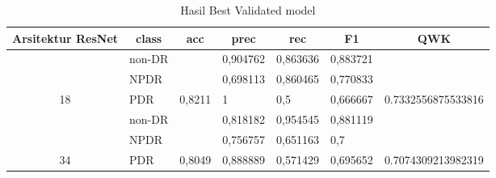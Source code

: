 \begin{table}[hbtp]
	\begin{center}
		\caption{Hasil Best Validated model}
		\label{tb:HasilValDefault}
		\begin{tabular}{|c|l|c|l|l|l|c|}
			\hline
			\rowcolor[HTML]{C0C0C0} 
			Arsitektur ResNet   & \multicolumn{1}{c|}{\cellcolor[HTML]{C0C0C0}class} & acc                      & \multicolumn{1}{c|}{\cellcolor[HTML]{C0C0C0}prec} & \multicolumn{1}{c|}{\cellcolor[HTML]{C0C0C0}rec} & \multicolumn{1}{c|}{\cellcolor[HTML]{C0C0C0}F1} & QWK                                  \\ \hline
			& non-DR                                             &                          & 0,904762                                          & 0,863636                                         & 0,883721                                        &                                      \\ \cline{2-2} \cline{4-6}
			& NPDR                                               &                          & 0,698113                                          & 0,860465                                         & 0,770833                                        &                                      \\ \cline{2-2} \cline{4-6}
			\multirow{-3}{*}{18}  & PDR                                                & \multirow{-3}{*}{0,8211} & 1                                                 & 0,5                                              & 0,666667                                        & \multirow{-3}{*}{0.7332556875533816} \\ \hline
			& non-DR                                             &                          & 0,818182                                          & 0,954545                                         & 0,881119                                        &                                      \\ \cline{2-2} \cline{4-6}
			& NPDR                                               &                          & 0,756757                                          & 0,651163                                         & 0,7                                             &                                      \\ \cline{2-2} \cline{4-6}
			\multirow{-3}{*}{34}  & PDR                                                & \multirow{-3}{*}{0,8049} & 0,888889                                          & 0,571429                                         & 0,695652                                        & \multirow{-3}{*}{0.7074309213982319} \\ \hline

\end{tabular}
\end{center}
\end{table}
